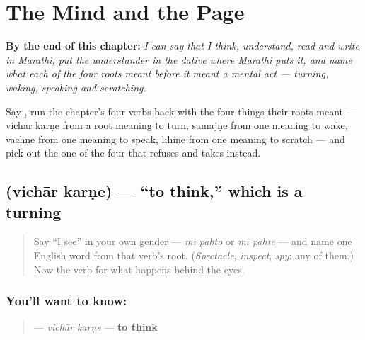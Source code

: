 
\chapter{The Mind and the Page}
\label{ch:mr-mind-and-page}

\begin{chapteropening}
\textbf{By the end of this chapter:} \emph{I can say that I think, understand, read and write in Marathi, put the understander in the dative where Marathi puts it, and name what each of the four roots meant before it meant a mental act — turning, waking, speaking and scratching.}

Say    , run the chapter's four verbs back with the four things their roots meant — vichār karṇe from a root meaning to turn, samajṇe from one meaning to wake, vāchṇe from one meaning to speak, lihiṇe from one meaning to scratch — and pick out the one of the four that refuses  and takes  instead.
\end{chapteropening}

\section[vichār karṇe]{  (vichār karṇe) — \textquotedblleft{}to think,\textquotedblright{} which is a turning}

\label{lesson:MR-C08-vichar-karne}



\begin{quote}
Say \textquotedblleft{}I see\textquotedblright{} in your own gender — \emph{mī pāhto} or \emph{mī pāhte} — and name one English word from that verb's root. (\emph{Spectacle}, \emph{inspect}, \emph{spy}: any of them.) Now the verb for what happens behind the eyes.
\end{quote}

\subsection*{You'll want to know:  }
\begin{quote}
\textbf{ } — \emph{vichār karṇe} — \textbf{to think}
\end{quote}

